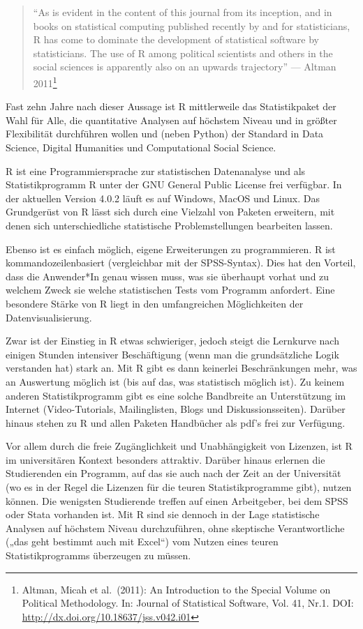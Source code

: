 \documentclass[
]{article}
\begin{document}
\begin{quote}
``As is evident in the content of this journal from its inception, and
in books on statistical computing published recently by and for
statisticians, R has come to dominate the development of statistical
software by statisticians. The use of R among political scientists and
others in the social sciences is apparently also on an upwards
trajectory'' --- Altman 2011\footnote{Altman, Micah et al.~(2011): An
  Introduction to the Special Volume on Political Methodology. In:
  Journal of Statistical Software, Vol. 41, Nr.1. DOI:
  \url{http://dx.doi.org/10.18637/jss.v042.i01}}
\end{quote}

Fast zehn Jahre nach dieser Aussage ist R mittlerweile das
Statistikpaket der Wahl für Alle, die quantitative Analysen auf höchstem
Niveau und in größter Flexibilität durchführen wollen und (neben Python)
der Standard in Data Science, Digital Humanities und Computational
Social Science.

R ist eine Programmiersprache zur statistischen Datenanalyse und als
Statistikprogramm R unter der GNU General Public License frei verfügbar.
In der aktuellen Version 4.0.2 läuft es auf Windows, MacOS und Linux.
Das Grundgerüst von R lässt sich durch eine Vielzahl von Paketen
erweitern, mit denen sich unterschiedliche statistische
Problemstellungen bearbeiten lassen.

Ebenso ist es einfach möglich, eigene Erweiterungen zu programmieren. R
ist kommandozeilenbasiert (vergleichbar mit der SPSS-Syntax). Dies hat
den Vorteil, dass die Anwender*In genau wissen muss, was sie überhaupt
vorhat und zu welchem Zweck sie welche statistischen Tests vom Programm
anfordert. Eine besondere Stärke von R liegt in den umfangreichen
Möglichkeiten der Datenvisualisierung.

Zwar ist der Einstieg in R etwas schwieriger, jedoch steigt die
Lernkurve nach einigen Stunden intensiver Beschäftigung (wenn man die
grundsätzliche Logik verstanden hat) stark an. Mit R gibt es dann
keinerlei Beschränkungen mehr, was an Auswertung möglich ist (bis auf
das, was statistisch möglich ist). Zu keinem anderen Statistikprogramm
gibt es eine solche Bandbreite an Unterstützung im Internet
(Video-Tutorials, Mailinglisten, Blogs und Diskussionsseiten). Darüber
hinaus stehen zu R und allen Paketen Handbücher als pdf's frei zur
Verfügung.

Vor allem durch die freie Zugänglichkeit und Unabhängigkeit von
Lizenzen, ist R im universitären Kontext besonders attraktiv. Darüber
hinaus erlernen die Studierenden ein Programm, auf das sie auch nach der
Zeit an der Universität (wo es in der Regel die Lizenzen für die teuren
Statistikprogramme gibt), nutzen können. Die wenigsten Studierende
treffen auf einen Arbeitgeber, bei dem SPSS oder Stata vorhanden ist.
Mit R sind sie dennoch in der Lage statistische Analysen auf höchstem
Niveau durchzuführen, ohne skeptische Verantwortliche („das geht
bestimmt auch mit Excel``) vom Nutzen eines teuren Statistikprogramms
überzeugen zu müssen.
\end{document}
